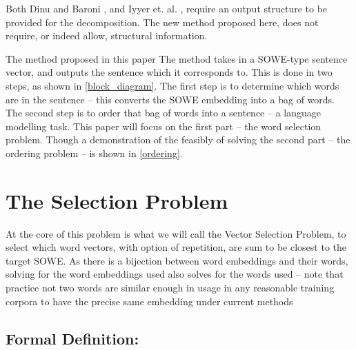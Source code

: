 \documentclass[]{scrartcl}
\numberwithin{equation}{section}
\numberwithin{figure}{section}
\theoremstyle{plain}
\theoremstyle{definition}
\begin{document}
Both Dinu and Baroni \cite{Dinu2014CompositionalGeneration}, and Iyyer et. al. \cite{iyyer2014generating}, require an output structure to be provided for the decomposition.
The new method proposed here, does not require, or indeed allow, structural information.



The method proposed in this paper The method takes in a SOWE-type sentence vector, and outputs the sentence which it corresponds to.
This is done in two steps, as shown in \cref{block_diagram}.
The first step is to determine which words are in the sentence -- this converts the SOWE embedding into a bag of words.
The second step is to order that bag of words into a sentence -- a language modelling task.
This paper will focus on the first part -- the word selection problem. 
Though a demonstration of the feasibly of solving the second part -- the ordering problem --  is shown in \cref{ordering}.

\section {The Selection Problem}


At the core of this problem is what we will call the Vector Selection Problem, to select which word vectors, with option of repetition, are sum to be closest to the target SOWE.
As there is a bijection between word embeddings and their words, solving for the word embeddings used also solves for the words used -- note that practice not two words are similar enough in usage in any reasonable training corpora to have the precise same embedding under current methods

\subsection{Formal Definition: }
\renewcommand{\c}{\tilde{c}}
\newcommand{\s}{\tilde{s}}
\newcommand{\x}{\tilde{x}}
\renewcommand{\t}{\tilde{t}}
\newcommand{\N}{\mathbb{N}}
\newcommand{\R}{\mathbb{R}}
\newcommand{\V}{\mathcal{V}}
\end{document}
